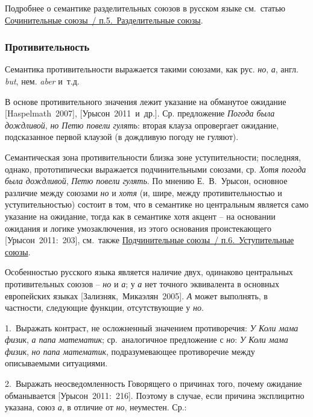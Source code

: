 Подробнее о семантике разделительных союзов в русском языке см.~статью
\underline{Сочинительные союзы~/ п.5.~Разделительные союзы}.

\hypertarget{ux43fux440ux43eux442ux438ux432ux438ux442ux435ux43bux44cux43dux43eux441ux442ux44c}{%
\subsubsection{Противительность}\label{ux43fux440ux43eux442ux438ux432ux438ux442ux435ux43bux44cux43dux43eux441ux442ux44c}}

Семантика противительности выражается такими союзами, как рус.
\emph{но}, \emph{а}, англ. \emph{but}, нем. \emph{aber} и~т.д.

В основе противительного значения лежит указание на обманутое ожидание
{[}Haspelmath~2007{]}, {[}Урысон~2011~и~др.{]}. Ср. предложение
\emph{Погода была дождливой}, \emph{но Петю повели гулять}: вторая
клауза опровергает ожидание, подсказанное первой клаузой (в дождливую
погоду не гуляют).

Семантическая зона противительности близка зоне уступительности;
последняя, однако, прототипически выражается подчинительными союзами,
ср. \emph{Хотя погода была дождливой}, \emph{Петю повели гулять}. По
мнению Е.~В.~Урысон, основное различие между союзами \emph{но} и
\emph{хотя} (и, шире, между противительностью и уступительностью)
состоит в том, что в семантике но центральным является само указание на
ожидание, тогда как в семантике хотя акцент -- на основании ожидания и
логике умозаключения, из этого основания проистекающего
{[}Урысон~2011:~203{]}, см.~также \underline{Подчинительные союзы~/
п.6.~Уступительные союзы}.

Особенностью русского языка является наличие двух, одинаково центральных
противительных союзов -- \emph{но} и \emph{а}; у \emph{а} нет точного
эквивалента в основных европейских языках {[}Зализняк,~Микаэлян~2005{]}.
\emph{А} может выполнять, в частности, следующие функции, отсутствующие
у \emph{но}.

1.~Выражать контраст, не осложненный значением противоречия: \emph{У
Коли мама физик}, \emph{а папа математик}; ср.~аналогичное предложение с
\emph{но}: \emph{У Коли мама физик}, \emph{но папа математик},
подразумевающее противоречие между описываемыми ситуациями.

2.~Выражать неосведомленность Говорящего о причинах того, почему
ожидание обманывается {[}Урысон~2011:~216{]}. Поэтому в случае, если
причина эксплицитно указана, союз \emph{а}, в отличие от \emph{но},
неуместен. Ср.:

